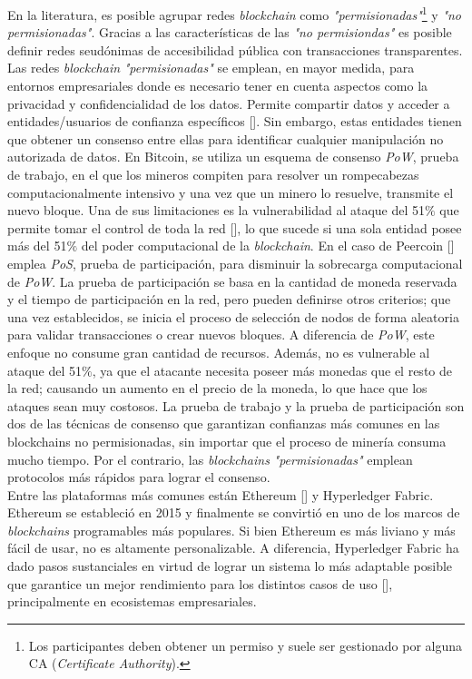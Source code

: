 En la literatura, es posible agrupar redes \emph{blockchain} como \emph{"permisionadas"}\footnote{Los participantes deben obtener un permiso y suele ser gestionado por alguna CA (\emph{Certificate Authority}).} y \emph{"no permisionadas"}. Gracias a las caracter\'isticas de las \emph{"no permisiondas"} es posible definir redes seud\'onimas de accesibilidad p\'ublica con transacciones transparentes.\\

Las redes \emph{blockchain} \emph{"permisionadas"} se emplean, en mayor medida, para entornos empresariales donde es necesario tener en cuenta aspectos como la privacidad y confidencialidad de los datos. Permite compartir datos y acceder a entidades/usuarios de confianza espec\'ificos [\cite{xu2017taxonomy}]. Sin embargo, estas entidades tienen que obtener un consenso entre ellas para identificar cualquier manipulaci\'on no autorizada de datos. En Bitcoin, se utiliza un esquema de consenso \emph{PoW}, prueba de trabajo, en el que los mineros compiten para resolver un rompecabezas computacionalmente intensivo y una vez que un minero lo resuelve, transmite el nuevo bloque. Una de sus limitaciones es la vulnerabilidad al ataque del 51$\%$ que permite tomar el control de toda la red [\cite{narayanan2016bitcoin}], lo que sucede si una sola entidad posee m\'as del 51$\%$ del poder computacional de la \emph{blockchain}. En el caso de Peercoin [\cite{king2012ppcoin}] emplea \emph{PoS}, prueba de participaci\'on, para disminuir la sobrecarga computacional de \emph{PoW}. La prueba de participaci\'on se basa en la cantidad de moneda reservada y el tiempo de participaci\'on en la red, pero pueden definirse otros criterios; que una vez establecidos, se inicia el proceso de selecci\'on de nodos de forma aleatoria para validar transacciones o crear nuevos bloques. A diferencia de \emph{PoW}, este enfoque no consume gran cantidad de recursos. Adem\'as, no es vulnerable al ataque del 51$\%$, ya que el atacante necesita poseer m\'as monedas que el resto de la red; causando un aumento en el precio de la moneda, lo que hace que los ataques sean muy costosos. La prueba de trabajo y la prueba de participaci\'on son dos de las t\'ecnicas de consenso que garantizan confianzas m\'as comunes en las blockchains no permisionadas, sin importar que el proceso de miner\'ia consuma mucho tiempo. Por el contrario, las \emph{blockchains} \emph{"permisionadas"} emplean protocolos m\'as r\'apidos para lograr el consenso.\\

Entre las plataformas m\'as comunes est\'an Ethereum [\cite{antonopoulos2018mastering}] y Hyperledger Fabric. Ethereum se estableci\'o en 2015 y finalmente se convirti\'o en uno de los marcos de \emph{blockchains} programables m\'as populares. Si bien Ethereum es m\'as liviano y m\'as f\'acil de usar, no es altamente personalizable. A diferencia, Hyperledger Fabric ha dado pasos sustanciales en virtud de lograr un sistema lo m\'as adaptable posible que garantice un mejor rendimiento para los distintos casos de uso [\cite{valenta2017comparison}], principalmente en ecosistemas empresariales.



